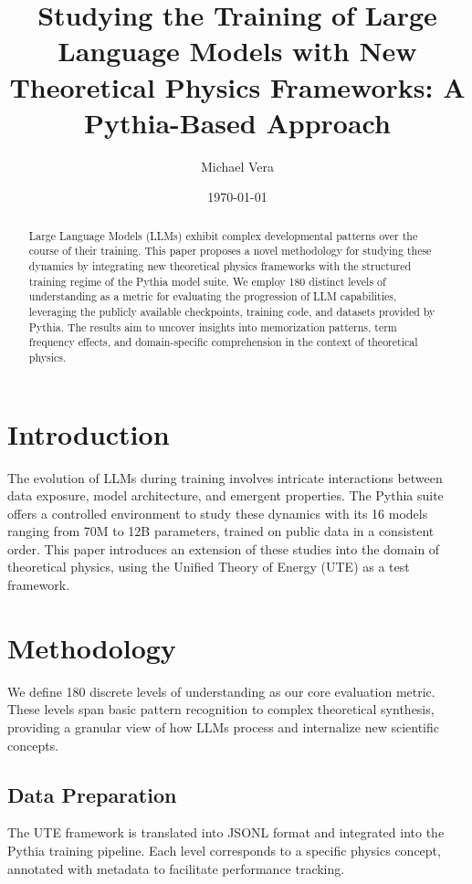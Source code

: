 \documentclass[12pt]{article}
\title{Studying the Training of Large Language Models with New Theoretical Physics Frameworks: A Pythia-Based Approach}
\author{Michael Vera}
\date{\today}
\begin{document}
\maketitle

\begin{abstract}
Large Language Models (LLMs) exhibit complex developmental patterns over the course of their training. This paper proposes a novel methodology for studying these dynamics by integrating new theoretical physics frameworks with the structured training regime of the Pythia model suite. We employ 180 distinct levels of understanding as a metric for evaluating the progression of LLM capabilities, leveraging the publicly available checkpoints, training code, and datasets provided by Pythia. The results aim to uncover insights into memorization patterns, term frequency effects, and domain-specific comprehension in the context of theoretical physics.
\end{abstract}

\section{Introduction}
The evolution of LLMs during training involves intricate interactions between data exposure, model architecture, and emergent properties. The Pythia suite \cite{biderman2023pythia} offers a controlled environment to study these dynamics with its 16 models ranging from 70M to 12B parameters, trained on public data in a consistent order. This paper introduces an extension of these studies into the domain of theoretical physics, using the Unified Theory of Energy (UTE) as a test framework.

\section{Methodology}
We define 180 discrete levels of understanding as our core evaluation metric. These levels span basic pattern recognition to complex theoretical synthesis, providing a granular view of how LLMs process and internalize new scientific concepts.

\subsection{Data Preparation}
The UTE framework is translated into JSONL format and integrated into the Pythia training pipeline. Each level corresponds to a specific physics concept, annotated with metadata to facilitate performance tracking.
\end{document}
